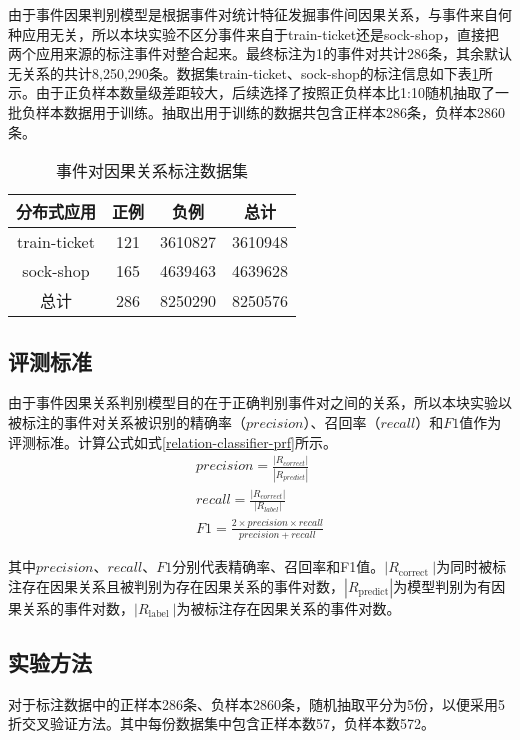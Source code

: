 由于事件因果判别模型是根据事件对统计特征发掘事件间因果关系，与事件来自何种应用无关，所以本块实验不区分事件来自于train-ticket还是sock-shop，直接把两个应用来源的标注事件对整合起来。最终标注为1的事件对共计286条，其余默认无关系的共计8,250,290‬条。数据集train-ticket、sock-shop的标注信息如下表\ref{event-cause-label}所示。由于正负样本数量级差距较大，后续选择了按照正负样本比1:10随机抽取了一批负样本数据用于训练。抽取出用于训练的数据共包含正样本286条，负样本2860条。
\begin{table}[htbp]
    \caption{事件对因果关系标注数据集}
    \centering
    \label{event-cause-label}
    \begin{tabular}{cccc}
    \toprule
        分布式应用     & 正例  & 负例      & 总计      \\ \midrule
    train-ticket & 121 & 3610827 & 3610948 \\
    sock-shop    & 165 & 4639463 & 4639628 \\ \midrule
    总计           & 286 & 8250290 & 8250576 \\ 
    \bottomrule
    \end{tabular}
\end{table}

\subsection{评测标准}
由于事件因果关系判别模型目的在于正确判别事件对之间的关系，所以本块实验以被标注的事件对关系被识别的精确率（$precision$）、召回率（$recall$）和$F1$值作为评测标准。计算公式如式\ref{relation-classifier-prf}所示。
\begin{equation}
    \begin{array}{c}
    precision =\frac{\left|R_{correct }\right|}{|R_{predict}|} \\
     recall =\frac{\left|R_{correct }\right|}{\left|R_{label }\right|}  \\
    F 1=\frac{2 \times  precision  \times  recall }{precision + recall }
    \end{array}
    \label{relation-classifier-prf}
\end{equation}{\Huge } 

其中$precision$、$recall$、$F1$分别代表精确率、召回率和F1值。$\left|R_{\text {correct }}\right|$为同时被标注存在因果关系且被判别为存在因果关系的事件对数，$|R_{\text {predict}}|$为模型判别为有因果关系的事件对数，$\left|R_{\text {label }}\right|$为被标注存在因果关系的事件对数。

\subsection{实验方法}
对于标注数据中的正样本286条、负样本2860条，随机抽取平分为5份，以便采用5折交叉验证方法。其中每份数据集中包含正样本数57，负样本数572。


